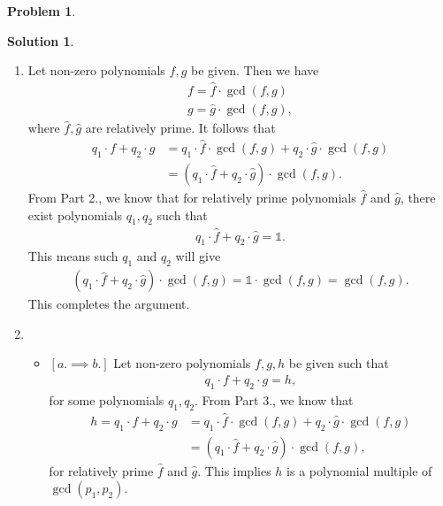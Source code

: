 \documentclass{article}
\theoremstyle{definition}
\newtheorem*{prob*}{Problem}
\newtheorem*{sln*}{Solution}
\begin{document}
\begin{prob*}
\begin{sln*}
\begin{enumerate}
	\item Let non-zero polynomials $f,g$ be given. Then we have
	\begin{align*}
	f = \hat{f}\cdot \gcd(f,g)\\
	g = \hat{g}\cdot \gcd(f,g),
	\end{align*}
	where $\hat{f}, \hat{g}$ are relatively prime. It follows that
	\begin{align*}
	q_1 \cdot f + q_2 \cdot g &= q_1 \cdot \hat{f}\cdot \gcd(f,g) + q_2 \cdot \hat{g}\cdot \gcd(f,g)\\
	&= (q_1 \cdot \hat{f} + q_2 \cdot \hat{g})\cdot \gcd(f,g).
	\end{align*}
	From Part 2., we know that for relatively prime polynomials $\hat{f}$ and $\hat{g}$, there exist polynomials $q_1, q_2$ such that
	\begin{align*}
	q_1 \cdot \hat{f} + q_2 \cdot \hat{g} = \mathbb{1}.
	\end{align*}
	This means such $q_1$ and $q_2$ will give
	\begin{align*}
	(q_1 \cdot \hat{f} + q_2 \cdot \hat{g})\cdot \gcd(f,g) = \mathbb{1}\cdot\gcd(f,g) = \gcd(f,g).
	\end{align*}
	This completes the argument.\\
	
	
	\item \begin{itemize}
		\item $[a.\implies b.]$ Let non-zero polynomials $f,g,h$ be given such that
		\begin{align*}
		q_1 \cdot f + q_2 \cdot g = h,
		\end{align*}
		for some polynomials $q_1, q_2$. From Part 3., we know that 
		\begin{align*}
		h = q_1 \cdot f + q_2 \cdot g &= q_1 \cdot \hat{f}\cdot \gcd(f,g) + q_2 \cdot \hat{g}\cdot \gcd(f,g)\\
		&= (q_1 \cdot \hat{f} + q_2 \cdot \hat{g})\cdot \gcd(f,g),
		\end{align*}
		for relatively prime $\hat{f}$ and $\hat{g}$. This implies $h$ is a polynomial multiple of $\gcd(p_1,p_2)$. \\
		

\end{itemize}
\end{enumerate}
\end{sln*}
\end{prob*}
\end{document}
